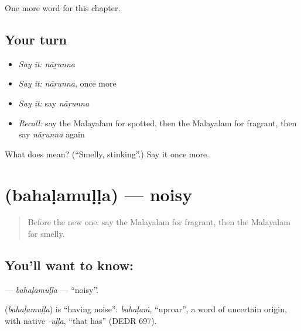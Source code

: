 \begin{grammarlens}[title={What you've built}]
One more word for this chapter.
\end{grammarlens}

\subsection*{Your turn}
\begin{itemize}
\raggedright
  \item \emph{Say it:} \emph{nāṟunna}
  \item \emph{Say it:} \emph{nāṟunna}, once more
  \item \emph{Say it:} say \emph{nāṟunna}
  \item \emph{Recall:} say the Malayalam for spotted, then the Malayalam for fragrant, then say \emph{nāṟunna} again
\end{itemize}

\begin{tcolorbox}[breakable,colback=teal!4,colframe=teal!35!black,title={Before you move on}]
What does  mean? (\textquotedblleft{}Smelly, stinking\textquotedblright{}.) Say it once more.
\end{tcolorbox}
\section[\texorpdfstring{\ml{ബഹളമുള്ള} (bahaḷamuḷḷa)}{ബഹളമുള്ള (bahaḷamuḷḷa)}]{ (bahaḷamuḷḷa) — noisy}

\label{lesson:ML-C321-bahalamulla}



\begin{quote}
Before the new one: say the Malayalam for fragrant, then the Malayalam for smelly.
\end{quote}

\subsection*{You'll want to know: }
\textbf{} — \emph{bahaḷamuḷḷa} — \textquotedblleft{}noisy\textquotedblright{}.

\begin{cousinweb}
\textbf{} (\emph{bahaḷamuḷḷa}) is \textquotedblleft{}having noise\textquotedblright{}: \emph{bahaḷaṁ}, \textquotedblleft{}uproar\textquotedblright{}, a word of uncertain origin, with native \emph{-uḷḷa}, \textquotedblleft{}that has\textquotedblright{} (DEDR 697).
\end{cousinweb}

